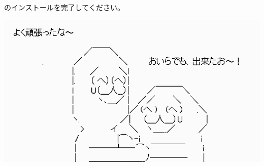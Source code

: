 のインストールを完了してください。

\begin{reviewimage}%
\includegraphics[width=0.6\maxwidth]{./images/01-createDevEnv/chap01-done.png}%
\label{image:01-createDevEnv:chap01-done}
\end{reviewimage}
